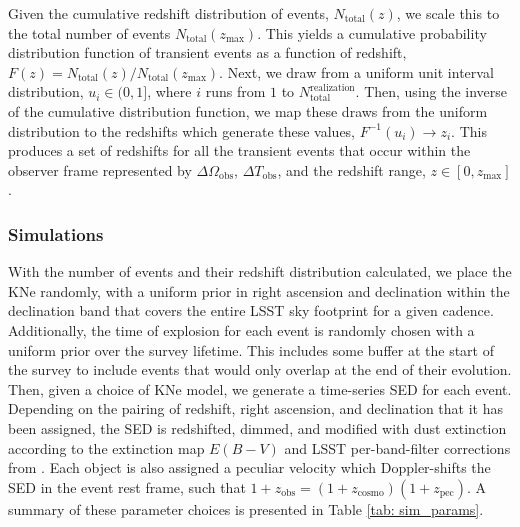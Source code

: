 Given the cumulative redshift distribution of events, $N_{\mathrm{total}}(z)$, we scale this to the total number of events $N_{\mathrm{total}}(z_{\mathrm{max}})$. This yields a cumulative probability distribution function of transient events as a function of redshift, $F(z) = N_{\mathrm{total}}(z)/ N_{\mathrm{total}}(z_{\mathrm{max}})$. Next, we draw from a uniform unit interval distribution, $u_i\in(0,1]$, where $i$ runs from $1$ to $N_{\mathrm{ total}}^{\mathrm{realization}}$. Then, using the inverse of the cumulative distribution function, we map these draws from the uniform distribution to the redshifts which generate these values, $F^{-1}(u_i) \rightarrow z_i$. This produces a set of redshifts for all the transient events that occur within the observer frame represented by $\Delta \Omega_{\mathrm{obs}}$, $\Delta T_{\mathrm{obs}}$, and the redshift range, $z \in [0,z_{\mathrm{max}}]$.

\begin{table}[ht!]
\centering
{}
 \caption{Parameters used to generate the simulated LSST kilonovae observations.}\label{tab: sim_params}
\end{table}

\subsubsection{Simulations}
With the number of events and their redshift distribution calculated, we place the KNe randomly, with a uniform prior in right ascension and declination within the declination band that covers the entire LSST sky footprint for a given cadence. Additionally, the time of explosion for each event is randomly chosen with a uniform prior over the survey lifetime. This includes some buffer at the start of the survey to include events that would only overlap at the end of their evolution. Then, given a choice of KNe model, we generate a time-series SED for each event. Depending on the pairing of redshift, right ascension, and declination that it has been assigned, the SED is redshifted, dimmed, and modified with dust extinction according to the extinction map $E(B-V)$ and LSST per-band-filter corrections from \citet{Schlafly2011}. Each object is also assigned a peculiar velocity which Doppler-shifts the SED in the event rest frame, such that $1 + z_{\mathrm{obs}} = (1+z_{\mathrm{cosmo}})(1+z_{\mathrm{pec}})$. A summary of these parameter choices is presented in Table \ref{tab: sim_params}.

